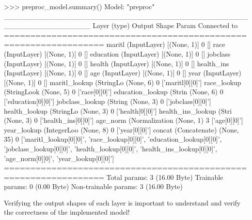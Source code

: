 \begin{withcode}
\begin{textcode}
>>> preproc_model.summary()
Model: "preproc"
_________________________________________________________________
Layer (type)            Output Shape Param Connected to                
=================================================================
maritl (InputLayer)     [(None, 1)]  0     []                            
race (InputLayer)       [(None, 1)]  0     []                            
education (InputLayer)  [(None, 1)]  0     []                            
jobclass (InputLayer)   [(None, 1)]  0     []                            
health (InputLayer)     [(None, 1)]  0     []                            
health_ins (InputLayer) [(None, 1)]  0     []                            
age (InputLayer)        [(None, 1)]  0     []                            
year (InputLayer)       [(None, 1)]  0     []                            
maritl_lookup (StringLo (None, 6)    0     ['maritl[0][0]']              
race_lookup (StringLook (None, 5)    0     ['race[0][0]']                
education_lookup (Strin (None, 6)    0     ['education[0][0]']           
jobclass_lookup (String (None, 3)    0     ['jobclass[0][0]']            
health_lookup (StringLo (None, 3)    0     ['health[0][0]']              
health_ins_lookup (Stri (None, 3)    0     ['health_ins[0][0]']          
age_norm (Normalization (None, 1)    3     ['age[0][0]']                 
year_lookup (IntegerLoo (None, 8)    0     ['year[0][0]']                
concat (Concatenate)    (None, 35)   0     ['maritl_lookup[0][0]',       
                                            'race_lookup[0][0]',         
                                            'education_lookup[0][0]',    
                                            'jobclass_lookup[0][0]',     
                                            'health_lookup[0][0]',       
                                            'health_ins_lookup[0][0]',   
                                            'age_norm[0][0]',            
                                            'year_lookup[0][0]']         
=================================================================
Total params: 3 (16.00 Byte)
Trainable params: 0 (0.00 Byte)
Non-trainable params: 3 (16.00 Byte)
\end{textcode}

\begin{alertbox}
Verifying the output shapes of each layer is important to understand and verify the correctness of the implemented model!
\end{alertbox}


\end{withcode}
